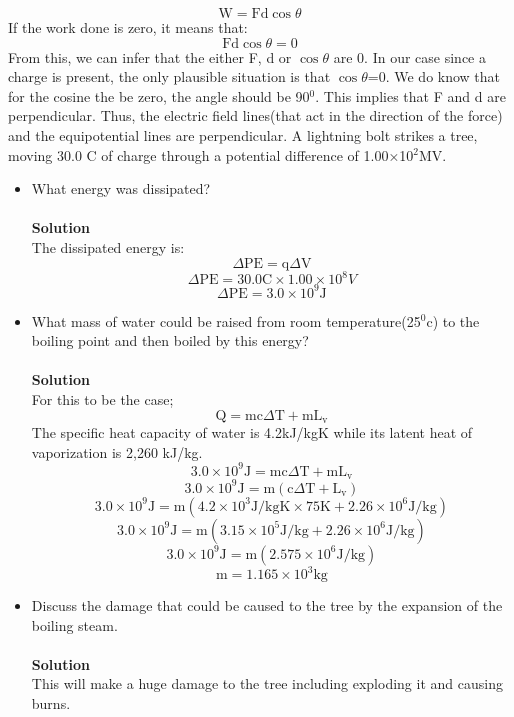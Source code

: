 \documentclass[9pt,addpoints]{exam}
\begin{document}
\begin{questions}
		$$\text{W}=\text{Fd}\cos\theta$$
		If the work done is zero, it means that:
		$$\text{Fd}\cos\theta=0$$
		From this, we can infer that the either F, d or $\cos\theta$ are 0. In our case since a charge is present, the only plausible situation is that $\cos\theta$=0. We do know that for the cosine the be zero, the angle should be 90$^0$. This implies that F and d are perpendicular. Thus, the electric field lines(that act in the direction of the force) and the equipotential lines are perpendicular.
		\question A lightning bolt strikes a tree, moving 30.0 C of charge through a potential difference of 1.00×10$^2$MV.\begin{itemize}
			\item What energy was dissipated?\\ \\
			\textbf{Solution}\\
			The dissipated energy is:
			$$\Delta\text{PE}=\text{q}\Delta\text{V}$$
			$$\Delta\text{PE}=30.0\text{C}\times1.00\times10^{8}V$$
			$$\Delta\text{PE}=3.0\times10^{9}\text{J}$$
			\item  What mass of water could be raised from  room temperature(25$^0$c) to the boiling point and then boiled by this energy?\\ \\
			\textbf{Solution}\\
			For this to be the case;
			$$\text{Q}=\text{mc}\Delta\text{T}+\text{mL}_\text{v}$$
			The specific heat capacity of water is 4.2kJ/kgK while its latent heat of vaporization is 2,260 kJ/kg.
			$$3.0\times10^{9}\text{J}=\text{mc}\Delta\text{T}+\text{mL}_\text{v}$$
			$$3.0\times10^{9}\text{J}=\text{m}(\text{c}\Delta\text{T}+\text{L}_\text{v})$$
			$$3.0\times10^{9}\text{J}=\text{m}(4.2\times10^3\text{J/kgK}\times75\text{K}+2.26\times10^6\text{J/kg})$$
			$$3.0\times10^{9}\text{J}=\text{m}(3.15\times10^5\text{J/kg}+2.26\times10^6\text{J/kg})$$
			$$3.0\times10^{9}\text{J}=\text{m}(2.575\times10^6\text{J/kg})$$
			$$\text{m}=1.165\times10^3\text{kg}$$
			\item Discuss the damage that could be caused to the tree by the expansion of the boiling steam.\\ \\
			\textbf{Solution}\\
			This will make a huge damage to the tree including exploding it and causing burns.
		\end{itemize} 
	\end{questions}		
\end{document}
